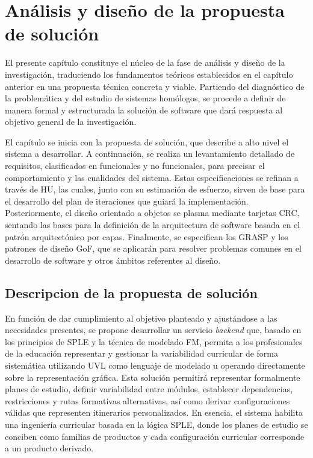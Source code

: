 \chapter{Análisis y diseño de la propuesta de solución}
\label{chap:chapter2}

El presente capítulo constituye el núcleo de la fase de análisis y diseño de la investigación, traduciendo
los fundamentos teóricos establecidos en el capítulo anterior en una propuesta técnica concreta y viable.
Partiendo del diagnóstico de la problemática y del estudio de sistemas homólogos, se procede a definir de
manera formal y estructurada la solución de software que dará respuesta al objetivo general de la investigación.

El capítulo se inicia con la propuesta de solución, que describe a alto nivel el sistema a desarrollar. 
A continuación, se realiza un levantamiento detallado de requisitos, clasificados en funcionales y no
funcionales, para precisar el comportamiento y las cualidades del sistema. Estas especificaciones se refinan
a través de \ac{HU}, las cuales, junto con su estimación de esfuerzo, sirven de base para el desarrollo del plan de
iteraciones que guiará la implementación. Posteriormente, el diseño orientado a objetos se plasma mediante
tarjetas \ac{CRC}, sentando las bases para la definición de la arquitectura de software basada en el patrón 
arquitectónico por capas. Finalmente, se especifican los \ac{GRASP} y los patrones de diseño \ac{GoF},  
que se aplicarán para resolver problemas comunes en el desarrollo de software y otros ámbitos referentes 
al diseño.

\section{Descripcion de la propuesta de solución}

En función de dar cumplimiento al objetivo planteado y ajustándose a las necesidades presentes,
se propone desarrollar un servicio \textit{backend} que, basado en los principios de \ac{SPLE}
y la técnica de modelado \ac{FM}, permita a los profesionales de la educación representar y 
gestionar la variabilidad curricular de forma sistemática utilizando \ac{UVL} como lenguaje de 
modelado u operando directamente sobre la representación gráfica. Esta solución permitirá representar 
formalmente planes de estudio, definir variabilidad entre módulos, establecer dependencias,
restricciones y rutas formativas alternativas, así como derivar configuraciones 
válidas que representen itinerarios personalizados. En esencia,
el sistema habilita una ingeniería curricular basada en la lógica \ac{SPLE},
donde los planes de estudio se conciben como familias de productos y
cada configuración curricular corresponde a un producto derivado.

